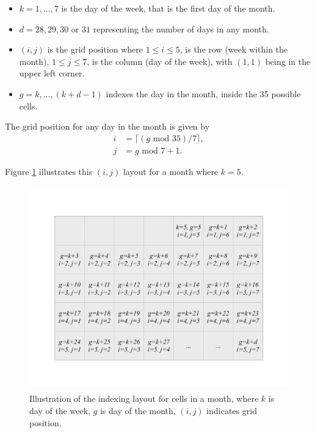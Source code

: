 \documentclass[12pt]{article}
\providecommand{\tightlist}{%
  \setlength{\itemsep}{0pt}\setlength{\parskip}{0pt}}
\begin{document}
\begin{itemize}
\tightlist
\item
  \(k = 1, \dots , 7\) is the day of the week, that is the first day of the month.
\item
  \(d = 28, 29, 30\) or \(31\) representing the number of days in any month.
\item
  \((i, j)\) is the grid position where \(1 \le i \le 5\), is the row (week within the month), \(1 \le j \le 7\), is the column (day of the week), with \((1, 1)\) being in the upper left corner.
\item
  \(g = k, \dots,(k + d - 1)\) indexes the day in the month, inside the 35 possible cells.
\end{itemize}

The grid position for any day in the month is given by
\begin{equation}
  \begin{aligned}
  i &= \lceil (g \text{ mod } 35) / 7\rceil, \\
  j &= g \text{ mod } 7 + 1.
  \end{aligned}
  \label{eq:grid}
\end{equation}

\noindent Figure \ref{fig:month-diagram} illustrates this \((i, j)\) layout for a month where \(k = 5\).

\begin{figure}

{\centering \includegraphics[width=360pt,height=250pt]{img/month} 

}

\caption{Illustration of the indexing layout for cells in a month, where \(k\) is day of the week, \(g\) is day of the month, \((i, j)\) indicates grid position.}\label{fig:month-diagram}
\end{figure}
\end{document}
